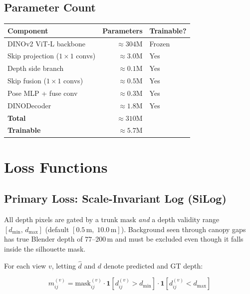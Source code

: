 \documentclass[11pt]{article}
\begin{document}
\subsection{Parameter Count}

\begin{center}
\begin{tabular}{lrl}
\toprule
\textbf{Component} & \textbf{Parameters} & \textbf{Trainable?} \\
\midrule
DINOv2 ViT-L backbone         & $\approx 304$M & \textcolor{warnred}{Frozen} \\
Skip projection ($1\times1$ convs) & $\approx 3.0$M & Yes \\
Depth side branch              & $\approx 0.1$M & Yes \\
Skip fusion ($1\times1$ convs) & $\approx 0.5$M & Yes \\
Pose MLP + fuse conv           & $\approx 0.3$M & Yes \\
DINODecoder                    & $\approx 1.8$M & Yes \\
\midrule
\textbf{Total}     & $\approx 310$M & \\
\textbf{Trainable} & $\approx 5.7$M & \\
\bottomrule
\end{tabular}
\end{center}

\section{Loss Functions}

\subsection{Primary Loss: Scale-Invariant Log (SiLog)}

All depth pixels are gated by a trunk mask \emph{and} a depth validity range
$[d_\text{min},\, d_\text{max}]$ (default $[0.5\,\text{m},\; 10.0\,\text{m}]$).
Background seen through canopy gaps has true Blender depth of $77$--$200\,$m
and must be excluded even though it falls inside the silhouette mask.

For each view $v$, letting $\hat{d}$ and $d$ denote predicted and GT depth:

\[
m^{(v)}_{ij} = \text{mask}^{(v)}_{ij}
               \cdot \mathbf{1}[d^{(v)}_{ij} > d_\text{min}]
               \cdot \mathbf{1}[d^{(v)}_{ij} < d_\text{max}]
\]
\end{document}
